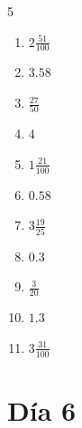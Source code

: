 \documentclass[12pt]{article}
\begin{document}
\begin{multicols}{5}
\begin{enumerate}
\item $ 2 \frac{51}{100} $
\item $ 3.58 $
\item $ \frac{27}{50} $
\item $ 4 $
\item $ 1 \frac{21}{100} $
\item $ 0.58 $
\item $ 3 \frac{19}{25} $
\item $ 0.3 $
\item $ \frac{3}{20} $
\item $ 1.3 $
\item $ 3 \frac{31}{100} $
\end{enumerate}\end{multicols}\newpage
\section*{Día 6}
\end{document}
